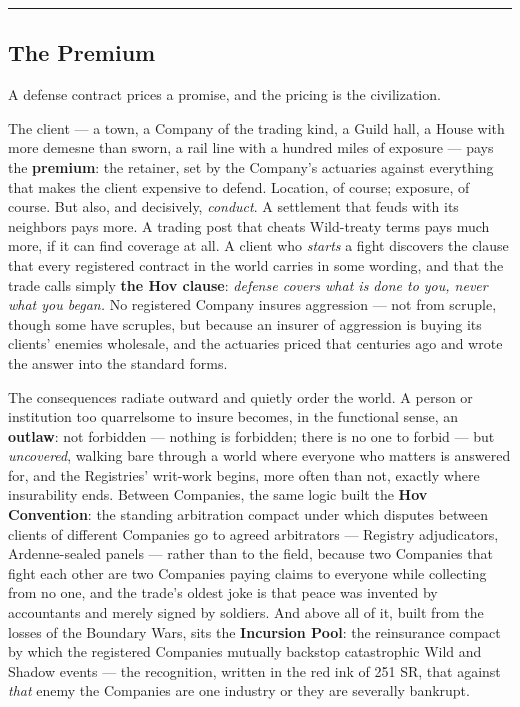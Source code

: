 \medskip\hrule\medskip

\subsection{The Premium}

A defense contract prices a promise, and the pricing is the civilization.

The client --- a town, a Company of the trading kind, a Guild hall, a House with more demesne than sworn, a rail line with a hundred miles of exposure --- pays the \textbf{premium}: the retainer, set by the Company's actuaries against everything that makes the client expensive to defend. Location, of course; exposure, of course. But also, and decisively, \textit{conduct}. A settlement that feuds with its neighbors pays more. A trading post that cheats Wild-treaty terms pays much more, if it can find coverage at all. A client who \textit{starts} a fight discovers the clause that every registered contract in the world carries in some wording, and that the trade calls simply \textbf{the Hov clause}: \textit{defense covers what is done to you, never what you began.} No registered Company insures aggression --- not from scruple, though some have scruples, but because an insurer of aggression is buying its clients' enemies wholesale, and the actuaries priced that centuries ago and wrote the answer into the standard forms.

The consequences radiate outward and quietly order the world. A person or institution too quarrelsome to insure becomes, in the functional sense, an \textbf{outlaw}: not forbidden --- nothing is forbidden; there is no one to forbid --- but \textit{uncovered}, walking bare through a world where everyone who matters is answered for, and the Registries' writ-work begins, more often than not, exactly where insurability ends. Between Companies, the same logic built the \textbf{Hov Convention}: the standing arbitration compact under which disputes between clients of different Companies go to agreed arbitrators --- Registry adjudicators, Ardenne-sealed panels --- rather than to the field, because two Companies that fight each other are two Companies paying claims to everyone while collecting from no one, and the trade's oldest joke is that peace was invented by accountants and merely signed by soldiers. And above all of it, built from the losses of the Boundary Wars, sits the \textbf{Incursion Pool}: the reinsurance compact by which the registered Companies mutually backstop catastrophic Wild and Shadow events --- the recognition, written in the red ink of 251 SR, that against \textit{that} enemy the Companies are one industry or they are severally bankrupt.

